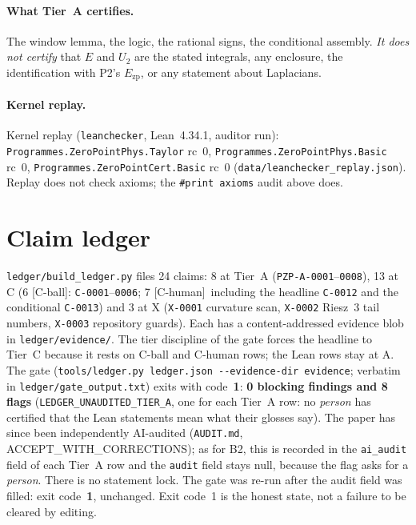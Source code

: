 \documentclass[10pt]{article}
\newcommand{\tier}[1]{\textsf{[#1]}}
\newcommand{\tCh}{\tier{C-human}}
\newcommand{\tCb}{\textcolor{blue!60!black}{\textsf{[C-ball]}}}
\newcommand{\lean}[1]{\texttt{#1}}
\newcommand{\Ezp}{E_{\mathrm{zp}}}
\begin{document}
\paragraph{What Tier~A certifies.} The window lemma, the logic, the rational signs, the conditional assembly. \emph{It does not certify} that $E$ and $U_2$ are the stated integrals, any enclosure, the identification with P2's $\Ezp$, or any statement about Laplacians.
\paragraph{Kernel replay.} Kernel replay (\texttt{leanchecker}, Lean~4.34.1, auditor run): \lean{Programmes.ZeroPointPhys.Taylor} rc~0, \lean{Programmes.ZeroPointPhys.Basic} rc~0, \lean{Programmes.ZeroPointCert.Basic} rc~0 (\texttt{data/leanchecker\_replay.json}). Replay does not check axioms; the \lean{\#print axioms} audit above does.

\section{Claim ledger}\label{sec:ledger}
\texttt{ledger/build\_ledger.py} files 24 claims: 8 at Tier~A (\texttt{PZP-A-0001}--\texttt{0008}), 13 at C (6 \tCb: \texttt{C-0001}--\texttt{0006}; 7 \tCh\ including the headline \texttt{C-0012} and the conditional \texttt{C-0013}) and 3 at X (\texttt{X-0001} curvature scan, \texttt{X-0002} Riesz~3 tail numbers, \texttt{X-0003} repository guards). Each has a content-addressed evidence blob in \texttt{ledger/evidence/}. The tier discipline of the gate forces the headline to Tier~C because it rests on C-ball and C-human rows; the Lean rows stay at A.
The gate (\texttt{tools/ledger.py ledger.json -{}-evidence-dir evidence}; verbatim in \texttt{ledger/gate\_output.txt}) exits with code~\textbf{1}: \textbf{0 blocking findings and 8 flags} (\texttt{LEDGER\_UNAUDITED\_TIER\_A}, one for each Tier~A row: no \emph{person} has certified that the Lean statements mean what their glosses say). The paper has since been independently AI-audited (\texttt{AUDIT.md}, ACCEPT\_WITH\_CORRECTIONS); as for B2, this is recorded in the \texttt{ai\_audit} field of each Tier~A row and the \texttt{audit} field stays null, because the flag asks for a \emph{person}. There is no statement lock. The gate was re-run after the audit field was filled: exit code~\textbf{1}, unchanged. Exit code~1 is the honest state, not a failure to be cleared by editing.
\end{document}
